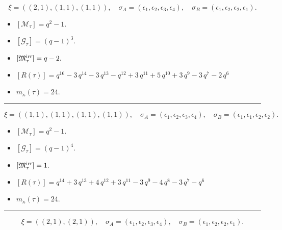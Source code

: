 \documentclass[10pt,a4paper]{amsart}
\begin{document}
$$\xi = ({(2, 1), (1, 1)}, {(1, 1)}),\quad \sigma_A = ({{\epsilon_1, \epsilon_2}, {\epsilon_3}}, {{\epsilon_4}}),\quad \sigma_B = ({{\epsilon_1, \epsilon_2}, {\epsilon_2}}, {{\epsilon_1}}).$$

\begin{itemize}
 \item $[\mathcal{M}_{\tau}] = q^{2} - 1 .$

 \item $[\mathcal{G}_{\tau}] = {\left(q - 1\right)}^{3} .$

 \item $[{\frak M}_{\tau}^{\textrm{irr}}] = q - 2 .$

 \item $[R(\tau)] = q^{16} - 3 \, q^{14} - 3 \, q^{13} - q^{12} + 3 \, q^{11} + 5 \, q^{10} + 3 \, q^{9} - 3 \, q^{7} - 2 \, q^{6} $

 \item $m_{\kappa}(\tau) = 24 .$

 \end{itemize}
\noindent\rule{8cm}{0.4pt}

$$\xi = ({(1, 1), (1, 1), (1, 1)}, {(1, 1)}),\quad \sigma_A = ({{\epsilon_1}, {\epsilon_2}, {\epsilon_3}}, {{\epsilon_4}}),\quad \sigma_B = ({{\epsilon_1}, {\epsilon_1}, {\epsilon_2}}, {{\epsilon_2}}).$$

\begin{itemize}
 \item $[\mathcal{M}_{\tau}] = q^{2} - 1 .$

 \item $[\mathcal{G}_{\tau}] = {\left(q - 1\right)}^{4} .$

 \item $[{\frak M}_{\tau}^{\textrm{irr}}] = 1 .$

 \item $[R(\tau)] = q^{14} + 3 \, q^{13} + 4 \, q^{12} + 3 \, q^{11} - 3 \, q^{9} - 4 \, q^{8} - 3 \, q^{7} - q^{6} $

 \item $m_{\kappa}(\tau) = 24 .$

 \end{itemize}
\noindent\rule{8cm}{0.4pt}

$$\xi = ({(2, 1)}, {(2, 1)}),\quad \sigma_A = ({{\epsilon_1, \epsilon_2}}, {{\epsilon_3, \epsilon_4}}),\quad \sigma_B = ({{\epsilon_1, \epsilon_2}}, {{\epsilon_2, \epsilon_1}}).$$
\end{document}
